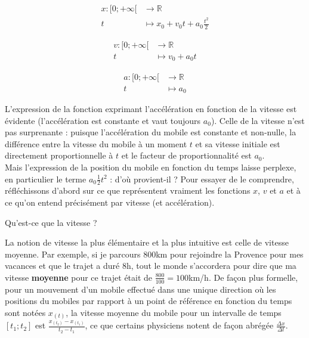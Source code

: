 \documentclass[a4paper,fontsize=13pt]{scrreprt}
\theoremstyle{plain}
\theoremstyle{definition}
\newcommand{\rr}{\mathbb{R}}
\begin{document}
\begin{itemize}
	\begin{multicols}{3}
		\item [~] \begin{align*}
		x : [0;+\infty[ &\to \rr \\
		t &\mapsto x_0 + v_0 t + a_0 \frac{t^2}{2}
		\end{align*}
		\item [~] \begin{align*}
		v : [0;+\infty[ &\to \rr \\
		t &\mapsto v_0 + a_0 t
		\end{align*}
		\item [~] \begin{align*}
		a : [0;+\infty[ &\to \rr \\
		t &\mapsto a_0
		\end{align*}
	\end{multicols}
\end{itemize}
L'expression de la fonction exprimant l'accélération en fonction de la vitesse est évidente (l'accélération est constante et vaut toujours $a_0$). Celle de la vitesse n'est pas surprenante : puisque l'accélération du mobile est constante et non-nulle, la différence entre la vitesse du mobile à un moment $t$ et sa vitesse initiale est directement proportionnelle à $t$ et le facteur de proportionnalité est $a_0$. \\
Mais l'expression de la position du mobile en fonction du temps laisse perplexe, en particulier le terme $a_0 \frac{1}{2} t^2$ : d'où provient-il ? Pour essayer de le comprendre, réfléchissons d'abord sur ce que représentent vraiment les fonctions $x$, $v$ et $a$ et à ce qu'on entend précisément par vitesse (et accélération).
\begin{center}
	\begin{Large}
		Qu'est-ce que la vitesse ?
	\end{Large}
\end{center}
La notion de vitesse la plus élémentaire et la plus intuitive est celle de vitesse moyenne. Par exemple, si je parcours $800$km pour rejoindre la Provence pour mes vacances et que le trajet a duré $8$h, tout le monde s'accordera pour dire que ma vitesse \textbf{moyenne} pour ce trajet était de $\frac{800}{100}=100$km/h. De façon plus formelle, pour un mouvement d'un mobile effectué dans une unique direction où les positions du mobiles par rapport à un point de référence en fonction du temps sont notées $x_{(t)}$, la vitesse moyenne du mobile pour un intervalle de temps $[t_1 ; t_2]$ est $\frac{x_{(t_2)} - x_{(t_1)}}{t_2 - t_1}$, ce que certains physiciens notent de façon abrégée $\frac{\Delta x}{\Delta t}$. \\
\end{document}
